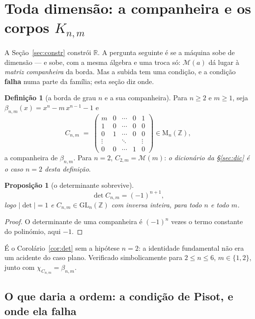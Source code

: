 \documentclass[11pt,a4paper]{article}
\theoremstyle{plain}
\newtheorem{proposicao}[teorema]{Proposição}
\theoremstyle{definition}
\newtheorem{definicao}[teorema]{Definição}
\theoremstyle{remark}
\newcommand{\R}{\mathbb{R}}
\newcommand{\Z}{\mathbb{Z}}
\newcommand{\Mat}[1]{\mathcal{M}(#1)}
\newcommand{\GL}{\mathrm{GL}}
\providecommand{\Comp}[2]{C_{#1,#2}}
\begin{document}
\section{Toda dimensão: a companheira e os corpos \texorpdfstring{$K_{n,m}$}{Knm}}\label{sec:dim}

A Seção~\ref{sec:constr} constrói $\R$. A pergunta seguinte é se a máquina sobe de dimensão --- e sobe, com a
mesma álgebra e uma troca só: $\Mat{a}$ dá lugar à \emph{matriz companheira} da borda. Mas a
subida tem uma condição, e a condição \textbf{falha} numa parte da família; esta seção diz onde.

\begin{definicao}[a borda de grau $n$ e a sua companheira]
Para $n\geq 2$ e $m\geq 1$, seja $\beta_{n,m}(x) = x^n - m\,x^{n-1} - 1$ e
\[
  \Comp{n}{m} \;=\;
  \begin{pmatrix}
    m & 0 & \cdots & 0 & 1\\
    1 & 0 & \cdots & 0 & 0\\
    0 & 1 & \cdots & 0 & 0\\
    \vdots & & \ddots & & \vdots\\
    0 & 0 & \cdots & 1 & 0
  \end{pmatrix} \in \mathrm{M}_n(\Z),
\]
a companheira de $\beta_{n,m}$. Para $n=2$, $\Comp{2}{m} = \Mat{m}$: \emph{o dicionário da \S\ref{sec:dic}
é o caso $n=2$ desta definição}.
\end{definicao}

\begin{proposicao}[o determinante sobrevive]\label{prop:detn}
\begin{equation}\label{eq:detn}\det \Comp{n}{m} = (-1)^{n+1},\end{equation} logo $|\det| = 1$ e $\Comp{n}{m} \in \GL_n(\Z)$ com inversa
inteira, para todo $n$ e todo $m$.
\end{proposicao}

\begin{proof}
O determinante de uma companheira é $(-1)^n$ vezes o termo constante do polinómio, aqui $-1$.
\end{proof}

\noindent É o Corolário~\ref{cor:det} sem a hipótese $n=2$: a identidade fundamental não era um
acidente do caso plano. Verificado simbolicamente para $2\leq n\leq 6$, $m\in\{1,2\}$, junto com
$\chi_{\Comp{n}{m}} = \beta_{n,m}$.

\subsection{O que daria a ordem: a condição de Pisot, e onde ela falha}
\end{document}
